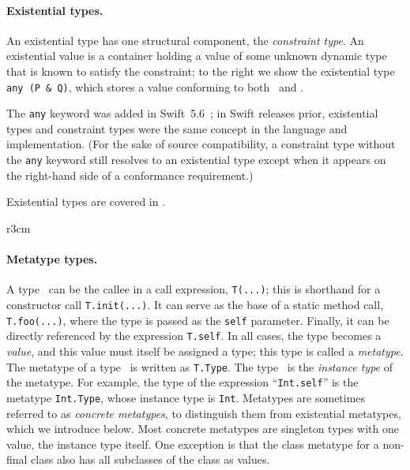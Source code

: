 \documentclass[../generics]{subfiles}
\begin{document}
\paragraph{Existential types.}
An existential type has one structural component, the \emph{constraint type}. An existential value is a container holding a value of some unknown dynamic type that is known to satisfy the constraint; to the right we show the existential type \verb|any (P & Q)|, which stores a value conforming to both \tP\ and \tQ.

The \texttt{any} keyword was added in Swift~5.6~\cite{se0355}; in Swift releases prior, existential types and constraint types were the same concept in the language and implementation. (For the sake of source compatibility, a constraint type without the \texttt{any} keyword still resolves to an existential type except when it appears on the right-hand side of a conformance requirement.)

Existential types are covered in .

\begin{wrapfigure}[9]{r}{3cm}
\end{wrapfigure}

\paragraph{Metatype types.} A type \tT\ can be the callee in a call expression, \texttt{T(...)}; this is shorthand for a constructor call \texttt{T.init(...)}. It can serve as the base of a static method call, \texttt{T.foo(...)}, where the type is passed as the \texttt{self} parameter. Finally, it can be directly referenced by the expression \texttt{T.self}. In all cases, the type becomes a \emph{value}, and this value must itself be assigned a type; this type is called a \emph{metatype}. The metatype of a type \tT\ is written as \texttt{T.Type}. The type \tT\ is the \emph{instance type} of the metatype. For example, the type of the expression ``\verb|Int.self|'' is the metatype \texttt{Int.Type}, whose instance type is \verb|Int|. Metatypes are sometimes referred to as \emph{concrete metatypes}, to distinguish them from existential metatypes, which we introduce below. Most concrete metatypes are singleton types with one value, the instance type itself. One exception is that the class metatype for a non-final class also has all subclasses of the class as values.
\end{document}
